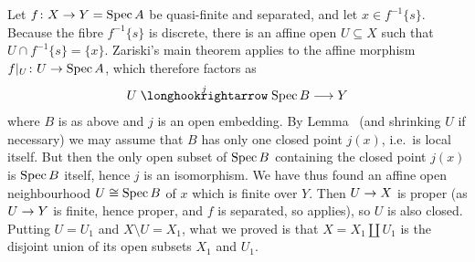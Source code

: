 \documentclass[a4paper,parskip=half,numbers=enddot, DIV=12]{scrreprt}
\begin{document}
Let $f\colon X\morphism Y=\Spec A$ be quasi-finite and separated, and let $x\in f^{-1}\{s\}$. Because the fibre $f^{-1}\{s\}$ is discrete, there is an affine open $U\subseteq X$ such that $U\cap f^{-1}\{s\}=\{x\}$. Zariski's main theorem applies to the affine morphism $f|_U\colon U\morphism \Spec A$, which therefore factors as
\begin{align*}
	U\monomorphism[j]\Spec B\morphism Y
\end{align*}
where $B$ is as above and $j$ is an open embedding. By Lemma~ (and shrinking $U$ if necessary) we may assume that $B$ has only one closed point $j(x)$, i.e.\ is local itself. But then the only open subset of $\operatorname{Spec} B$ containing the closed point $j(x)$ is $\operatorname{Spec} B$ itself, hence $j$ is an isomorphism. We have thus found an affine open neighbourhood $U\cong \operatorname{Spec} B$ of $x$ which is finite over $Y$. Then $U\morphism X$ is proper (as $U\morphism Y$ is finite, hence proper, and $f$ is separated, so \cite[Proposition~2.4.1]{alggeo2} applies), so $U$ is also closed. Putting $U=U_1$ and $X\setminus U=X_1$, what we proved is that $X=X_1\amalg U_1$ is the disjoint union of its open subsets $X_1$ and $U_1$.
\end{document}
